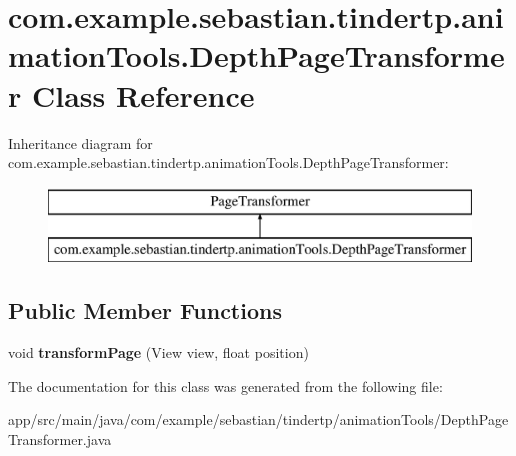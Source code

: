 \hypertarget{classcom_1_1example_1_1sebastian_1_1tindertp_1_1animationTools_1_1DepthPageTransformer}{}\section{com.\+example.\+sebastian.\+tindertp.\+animation\+Tools.\+Depth\+Page\+Transformer Class Reference}
\label{classcom_1_1example_1_1sebastian_1_1tindertp_1_1animationTools_1_1DepthPageTransformer}
Inheritance diagram for com.\+example.\+sebastian.\+tindertp.\+animation\+Tools.\+Depth\+Page\+Transformer\+:\begin{figure}[H]
\begin{center}
\leavevmode
\includegraphics[height=2.000000cm]{classcom_1_1example_1_1sebastian_1_1tindertp_1_1animationTools_1_1DepthPageTransformer}
\end{center}
\end{figure}
\subsection*{Public Member Functions}
\begin{DoxyCompactItemize}
\item 
void {\bfseries transform\+Page} (View view, float position)\hypertarget{classcom_1_1example_1_1sebastian_1_1tindertp_1_1animationTools_1_1DepthPageTransformer_ae820f63d5a8e39e11a55be7f0f241c8a}{}\label{classcom_1_1example_1_1sebastian_1_1tindertp_1_1animationTools_1_1DepthPageTransformer_ae820f63d5a8e39e11a55be7f0f241c8a}

\end{DoxyCompactItemize}


The documentation for this class was generated from the following file\+:\begin{DoxyCompactItemize}
\item 
app/src/main/java/com/example/sebastian/tindertp/animation\+Tools/Depth\+Page\+Transformer.\+java\end{DoxyCompactItemize}
